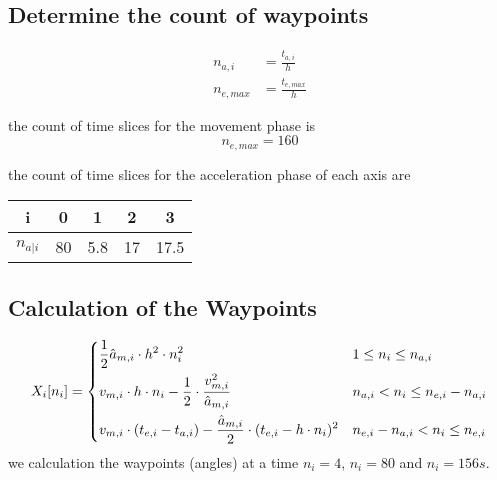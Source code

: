 \documentclass[%
  professionalfonts,%
  xcolor={%
    usenames,%
    dvipsnames,%
    svgnames,%
    table,%
    hyperref%
  }%
]{beamer}
\begin{document}
\subsection{Determine the count of waypoints}
\begin{frame}
\begin{align}
n_{a,i} & = \frac{t_{a,i}}{h} \\
n_{e,max} & = \frac{t_{e,max}}{h}
\end{align}

the count of time slices for the movement phase is 
\begin{equation*}
n_{e,max} = 160
\end{equation*}

the count of time slices for the acceleration phase of each axis are
\begin{center}
\begin{tabular}{ccccc}
\toprule
i & 0 & 1 & 2 & 3 \\
\midrule
$n_{a|i}$ & 80 & 5.8 & 17 & 17.5 \\
\bottomrule
\end{tabular}
\end{center}
\end{frame}

\subsection{Calculation of the Waypoints}
\begin{frame}
\begin{equation*}
X_{i}[n_{i}] = 
\begin{dcases}
\frac{1}{2} \hat{a}_{m,i} \cdot h^2 \cdot n_{i}^2 & 1 \leq n_{i} \leq n_{a,i} \\ 
v_{m,i} \cdot h \cdot n_{i} - \frac{1}{2} \cdot \frac{v_{m,i}^2}{\hat{a}_{m,i}} & n_{a,i} < n_{i} \leq n_{e,i} - n_{a,i} \\
v_{m,i} \cdot (t_{e,i} - t_{a,i}) - \frac{\hat{a}_{m,i}}{2} \cdot (t_{e,i} - h \cdot n_{i})^2   & n_{e,i} - n_{a,i} < n_{i} \leq n_{e,i}
\end{dcases}
\end{equation*}
we calculation the waypoints (angles) at a time $n_i = 4$, $n_i = 80$ and $n_i = 156s$.
\end{frame}
\end{document}
